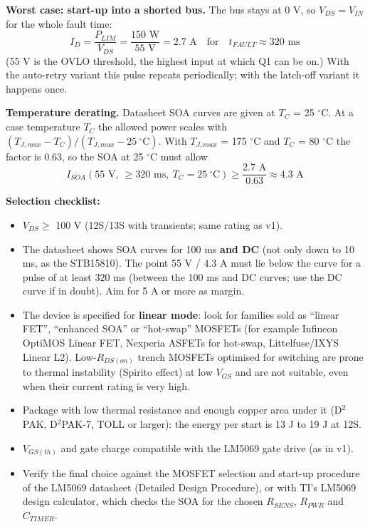 \documentclass[11pt,a4paper]{article}
\begin{document}
\textbf{Worst case: start-up into a shorted bus.} The bus stays at 0 V, so $V_{DS} = V_{IN}$ for the whole fault time:
\begin{equation}
I_{D} = \frac{P_{LIM}}{V_{DS}} = \frac{150 \text{ W}}{55 \text{ V}} = 2.7 \text{ A} \quad \text{for} \quad t_{FAULT} \approx 320 \text{ ms}
\end{equation}
(55 V is the OVLO threshold, the highest input at which Q1 can be on.) With the auto-retry variant this pulse repeats periodically; with the latch-off variant it happens once.

\textbf{Temperature derating.} Datasheet SOA curves are given at $T_C$ = 25 $^\circ$C. At a case temperature $T_C$ the allowed power scales with $(T_{J,max} - T_C)/(T_{J,max} - 25\ ^\circ\text{C})$. With $T_{J,max}$ = 175 $^\circ$C and $T_C$ = 80 $^\circ$C the factor is 0.63, so the SOA at 25 $^\circ$C must allow
\begin{equation}
I_{SOA}(55 \text{ V},\ \geq 320 \text{ ms},\ T_C = 25\ ^\circ\text{C}) \geq \frac{2.7 \text{ A}}{0.63} \approx 4.3 \text{ A}
\end{equation}

\textbf{Selection checklist:}
\begin{itemize}
    \item $V_{DS} \geq$ 100 V (12S/13S with transients; same rating as v1).
    \item The datasheet shows SOA curves for 100 ms \textbf{and DC} (not only down to 10 ms, as the STB15810). The point 55 V / 4.3 A must lie below the curve for a pulse of at least 320 ms (between the 100 ms and DC curves; use the DC curve if in doubt). Aim for 5 A or more as margin.
    \item The device is specified for \textbf{linear mode}: look for families sold as ``linear FET'', ``enhanced SOA'' or ``hot-swap'' MOSFETs (for example Infineon OptiMOS Linear FET, Nexperia ASFETs for hot-swap, Littelfuse/IXYS Linear L2). Low-$R_{DS(on)}$ trench MOSFETs optimised for switching are prone to thermal instability (Spirito effect) at low $V_{GS}$ and are not suitable, even when their current rating is very high.
    \item Package with low thermal resistance and enough copper area under it (D$^2$PAK, D$^2$PAK-7, TOLL or larger): the energy per start is 13 J to 19 J at 12S.
    \item $V_{GS(th)}$ and gate charge compatible with the LM5069 gate drive (as in v1).
    \item Verify the final choice against the MOSFET selection and start-up procedure of the LM5069 datasheet (Detailed Design Procedure), or with TI's LM5069 design calculator, which checks the SOA for the chosen $R_{SENS}$, $R_{PWR}$ and $C_{TIMER}$.
\end{itemize}
\end{document}
